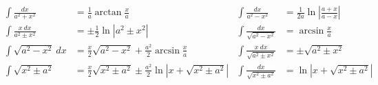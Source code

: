 \begin{align*}
	\int\frac{dx}{a^2+x^2}&=\frac1a\arctan\frac{x}{a} &
	\int\frac{dx}{a^2-x^2}&=\frac1{2a}\ln\left|\frac{a+x}{a-x}\right| \\
	\int\frac{x\ dx}{a^2\pm x^2}&=\pm\frac12\ln|a^2\pm x^2| &
	\int\frac{dx}{\sqrt{a^2-x^2}}&=\arcsin\frac{x}{a} \\
	\int\sqrt{a^2-x^2}\ dx&=\frac{x}{2}\sqrt{a^2 - x^2} + \frac{a^2}{2}\arcsin{\frac{x}{a}} &
	\int\frac{x\ dx}{\sqrt{a^2\pm x^2}}&=\pm\sqrt{a^2\pm x^2} \\
	\int\sqrt{x^2 \pm a^2}&=\frac{x}{2}\sqrt{x^2 \pm a^2} \pm \frac{a^2}{2}\ln|x+\sqrt{x^2 \pm a^2}| &
	\int\frac{dx}{\sqrt{x^2\pm a^2}}&=\ln|x+\sqrt{x^2\pm a^2}| 
\end{align*}

